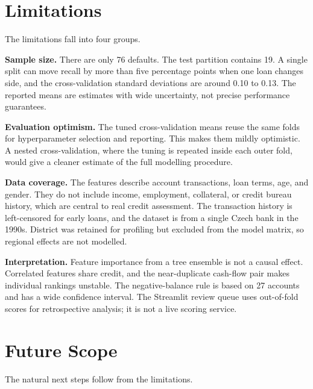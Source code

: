 \section{Limitations}
\label{sec:limitations}

The limitations fall into four groups.

\textbf{Sample size.} There are only 76 defaults. The test partition contains 19. A single split can move recall by more than five percentage points when one loan changes side, and the cross-validation standard deviations are around 0.10 to 0.13. The reported means are estimates with wide uncertainty, not precise performance guarantees.

\textbf{Evaluation optimism.} The tuned cross-validation means reuse the same folds for hyperparameter selection and reporting. This makes them mildly optimistic. A nested cross-validation, where the tuning is repeated inside each outer fold, would give a cleaner estimate of the full modelling procedure.

\textbf{Data coverage.} The features describe account transactions, loan terms, age, and gender. They do not include income, employment, collateral, or credit bureau history, which are central to real credit assessment. The transaction history is left-censored for early loans, and the dataset is from a single Czech bank in the 1990s. District was retained for profiling but excluded from the model matrix, so regional effects are not modelled.

\textbf{Interpretation.} Feature importance from a tree ensemble is not a causal effect. Correlated features share credit, and the near-duplicate cash-flow pair makes individual rankings unstable. The negative-balance rule is based on 27 accounts and has a wide confidence interval. The Streamlit review queue uses out-of-fold scores for retrospective analysis; it is not a live scoring service.

\section{Future Scope}
\label{sec:future-scope}

The natural next steps follow from the limitations.

